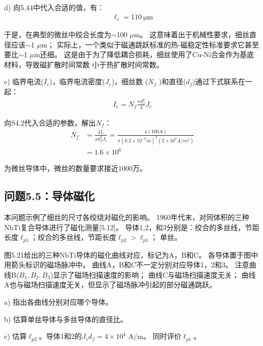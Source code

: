 d) 向5.44中代入合适的值，有：
\begin{align*}%
\ell_{c}=110\ \mathrm{\mu m}
\end{align*}

于是，在典型的微丝中绞合长度为$\sim$100 $\mu$m。
这意味着出于机械性要求，细丝直径应该$\sim$1 $\mu$m；
实际上，一个类似于磁通跳跃标准的热-磁稳定性标准要求它甚至要比$\sim$1 $\mu$m还细。
这是由于为了降低耦合损耗，细丝使用了Cu-Ni合金作为基底材料，导致磁扩散时间常数
小于热扩散时间常数。

e) 临界电流($I_c$)，临界电流密度($J_c$)，细丝数 ($N_f$ )和直径($d_f$)通过下式联系在一起：
\begin{align*}%
I_c=N_f\frac{\pi d_f^2}{4} J_c \tag{S4.2}
\end{align*}

向S4.2代入合适的参数，解出$N_f$：
\begin{align*}%
N_{f}&=\frac{4I_{c}}{\pi d_{f}^{2}J_{c}}=\frac{4(100A)}{\pi(0.2\times10^{-6}m)^{2}(2\times10^{9}A/m^{2})}\\
&=1.6\times 10^{6}
\end{align*}

为微丝导体中，微丝的数量要求接近1000万。



\subsection{问题5.5：导体磁化}
本问题示例了细丝的尺寸各绞绕对磁化的影响。
1960年代末，对同体积的三种NbTi复合导体进行了磁化测量[5.12]。
导体1,2，和3分别是：绞合的多丝线，节距长度$\ell_{p1}$；绞合的多丝线，节距长度$\ell_{p2}>\ell_{p1}$；
单丝。

图5.21给出的三种NbTi导体的磁化曲线对应，标记为A，B和C。
各导体置于图中用箭头标识的磁场脉冲中。
曲线A，B和C不一定分别对应导体1，2和3。
注意曲线B($B_1,B_2,B_3$)显示了磁场扫描速度的影响；
曲线C与磁场扫描速度无关；
曲线A也与磁场扫描速度无关，但显示了磁场脉冲引起的部分磁通跳跃。

a) 指出各曲线分别对应哪个导体。

b) 估算单丝导体与多丝导体的直径比。

c) 估算$\ell_{p2}$。导体1和2的$J_cd_f = 4\times 10^4$ A/m。
同时评价$\ell_{p1}$。

